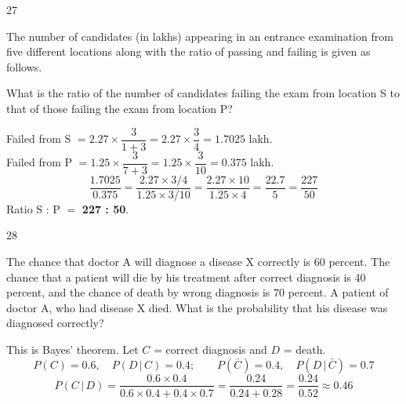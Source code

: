\begin{question}{27}
{The number of candidates (in lakhs) appearing in an entrance examination from five different locations along with the ratio of passing and failing is given as follows.\par}
What is the ratio of the number of candidates failing the exam from location S to that of those failing the exam from location P?
\begin{explain}
Failed from S $= 2.27 \times \dfrac{3}{1+3} = 2.27\times\dfrac34 = 1.7025$ lakh.\\
Failed from P $= 1.25 \times \dfrac{3}{7+3} = 1.25\times\dfrac{3}{10} = 0.375$ lakh.
\[\frac{1.7025}{0.375} = \frac{2.27\times 3/4}{1.25\times 3/10} = \frac{2.27\times 10}{1.25\times 4} = \frac{22.7}{5} = \frac{227}{50}\]
Ratio S : P $=$ \textbf{227 : 50}.
\end{explain}
\end{question}

\begin{question}{28}
{The chance that doctor A will diagnose a disease X correctly is 60 percent. The chance that a patient will die by his treatment after correct diagnosis is 40 percent, and the chance of death by wrong diagnosis is 70 percent. A patient of doctor A, who had disease X died. What is the probability that his disease was diagnosed correctly?\par}
\begin{explain}
This is Bayes' theorem. Let $C$ = correct diagnosis and $D$ = death.
\[P(C)=0.6,\quad P(D\,|\,C)=0.4;\qquad P(\bar C)=0.4,\quad P(D\,|\,\bar C)=0.7\]
\[P(C\,|\,D)=\frac{0.6\times0.4}{0.6\times0.4+0.4\times0.7}=\frac{0.24}{0.24+0.28}=\frac{0.24}{0.52}\approx \mathbf{0.46}\]
\begin{center}
\end{center}
\end{explain}
\end{question}

